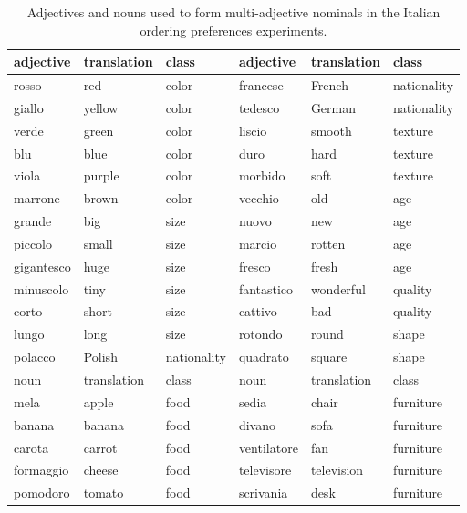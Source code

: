\documentclass[11pt]{article}
\begin{document}
\begin{table}[htb]
	\caption{Adjectives and nouns used to form multi-adjective nominals in the Italian ordering preferences experiments.}
	\label{materials}
	\vspace{5pt}
	\centering
	\begin{tabular}{lll|lll}
		\toprule
		adjective & translation & class & 	adjective & translation & class  \\ \hline
		rosso	&	red		&	color		&	francese	&	French	& nationality\\
		giallo	&	yellow	& 	color		&	tedesco		&	German	& nationality\\
		verde	&	green	& 	color		&	liscio		&	smooth	& texture\\
		blu		&	blue	& 	color		&	duro		&	hard	& texture\\
		viola	& 	purple	& 	color		&	morbido		&	soft	& texture\\
		marrone	& 	brown	&  	color		&	vecchio		&	old		& age\\
		grande	& 	big		& 	size		&	nuovo		&	new		& age\\
		piccolo	& 	small	& 	size		&	marcio		&	rotten	& age\\
		gigantesco & huge	&	size		&	fresco		&	fresh	& age\\
		minuscolo & tiny	&	size		&	fantastico	&	wonderful & quality\\
		corto	&	short	&	size		&	cattivo		&	bad		& quality\\
		lungo	&	long	&	size		&	rotondo		& 	round	& shape\\	
		polacco &	Polish	&	nationality	&	quadrato	&	square	& shape\\ \bottomrule \toprule
		noun 	& translation & class		&	noun		&	translation & class \\ \hline
		mela	&	apple	&	food		&	sedia		&	chair	& furniture \\
		banana	&	banana	&	food		&	divano		&	sofa	& furniture \\
		carota	&	carrot	&	food		&	ventilatore	&	fan		& furniture \\
		formaggio &	cheese	&	food		&	televisore	&	television & furniture \\
		pomodoro &	tomato	&	food		&	scrivania	&	desk	& furniture \\ \bottomrule
	\end{tabular}
\end{table}
\end{document}

